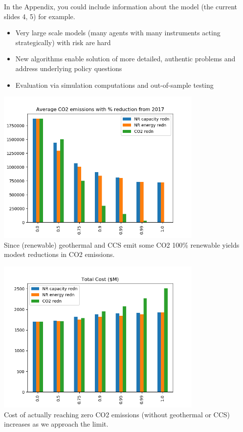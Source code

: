 \documentclass[xcolor=dvipsnames]{beamer}
\begin{document}
\appendix

\begin{frame}
In the Appendix, you could include information about the model (the
current slides 4, 5) for example.
\begin{itemize}
  \item \color{black} Very large scale models (many agents with many instruments
    acting strategically) with risk are hard
  \item \alert{New algorithms enable solution of more detailed,
      authentic problems and address underlying policy questions}
  \item Evaluation via simulation computations and out-of-sample testing
\end{itemize}
\end{frame}
  
\begin{frame}
  \centering
  \includegraphics[width=4.0in]{includes/TotalCarbonv20.png} \\
  Since (renewable) geothermal and CCS emit some CO2 100\% renewable yields modest reductions in CO2 emissions.
\end{frame}

\begin{frame}

  \centering
  \includegraphics[width=4.0in]{includes/TotalCostMv20.png} \\
  Cost of actually reaching zero CO2 emissions (without geothermal or CCS) increases as we approach the limit.
\end{frame}
\end{document}
